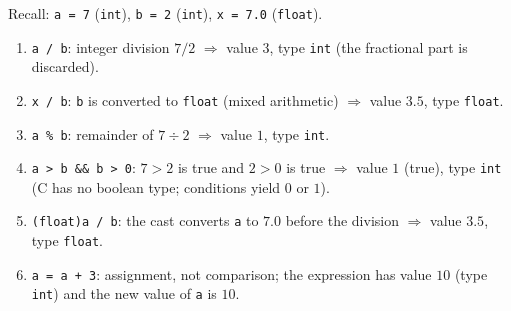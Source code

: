 \documentclass[11pt]{article}
\begin{document}
\begin{corrige}
Recall: \texttt{a = 7} (\texttt{int}), \texttt{b = 2} (\texttt{int}), \texttt{x = 7.0} (\texttt{float}).
\begin{enumerate}
\item \texttt{a / b}: integer division $7/2$ $\Rightarrow$ value $3$, type \texttt{int} (the fractional part is discarded).
\item \texttt{x / b}: \texttt{b} is converted to \texttt{float} (mixed arithmetic) $\Rightarrow$ value $3.5$, type \texttt{float}.
\item \texttt{a \% b}: remainder of $7 \div 2$ $\Rightarrow$ value $1$, type \texttt{int}.
\item \texttt{a > b \&\& b > 0}: $7 > 2$ is true and $2 > 0$ is true $\Rightarrow$ value $1$ (true), type \texttt{int} (C has no boolean type; conditions yield $0$ or $1$).
\item \texttt{(float)a / b}: the cast converts \texttt{a} to $7.0$ before the division $\Rightarrow$ value $3.5$, type \texttt{float}.
\item \texttt{a = a + 3}: assignment, not comparison; the expression has value $10$ (type \texttt{int}) and the new value of \texttt{a} is $10$.
\end{enumerate}
\end{corrige}
\end{document}
